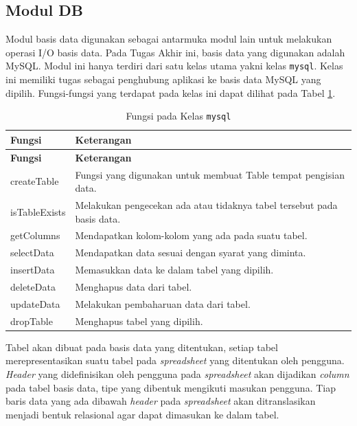 	\subsection{Modul DB}
	Modul basis data digunakan sebagai antarmuka modul lain untuk melakukan operasi I/O basis data. Pada Tugas Akhir ini, basis data yang digunakan adalah MySQL. Modul ini hanya terdiri dari satu kelas utama yakni kelas \texttt{mysql}. Kelas ini memiliki tugas sebagai penghubung aplikasi ke basis data MySQL yang dipilih. Fungsi-fungsi yang terdapat pada kelas ini dapat dilihat pada Tabel \ref{FungsiModulDB}.

	\begin{small}
	\begin{longtable}{ | p{2cm} | p{10cm} | }
	    \caption{Fungsi pada Kelas \texttt{mysql}}
	    \label{FungsiModulDB}\\ \hline
	    \centering\bfseries{Fungsi} & \centering\bfseries{Keterangan} \tabularnewline \hline
	    \endfirsthead
	    \hline
	    \centering\bfseries{Fungsi} & \centering\bfseries{Keterangan} \tabularnewline \hline
	    \endhead
	    createTable & Fungsi yang digunakan untuk membuat Table tempat pengisian data.\\ \hline
	    isTableExists & Melakukan pengecekan ada atau tidaknya tabel tersebut pada basis data.\\ \hline
	    getColumns & Mendapatkan kolom-kolom yang ada pada suatu tabel.\\ \hline
	    selectData & Mendapatkan data sesuai dengan syarat yang diminta.\\ \hline
	    insertData & Memasukkan data ke dalam tabel yang dipilih.\\ \hline
	    deleteData & Menghapus data dari tabel.\\ \hline
	    updateData & Melakukan pembaharuan data dari tabel.\\ \hline
	    dropTable & Menghapus tabel yang dipilih.\\ \hline
	\end{longtable}
	\end{small}

	Tabel akan dibuat pada basis data yang ditentukan, setiap tabel merepresentasikan suatu tabel pada \textit{spreadsheet} yang ditentukan oleh pengguna. \textit{Header} yang didefinisikan oleh pengguna pada \textit{spreadsheet} akan dijadikan \textit{column} pada tabel basis data, tipe yang dibentuk mengikuti masukan pengguna. Tiap baris data yang ada dibawah \textit{header} pada \textit{spreadsheet} akan ditranslasikan menjadi bentuk relasional agar dapat dimasukan ke dalam tabel.
	
